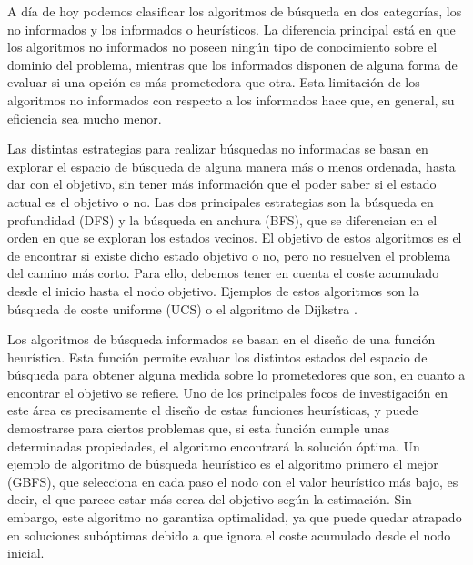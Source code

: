 \documentclass[a4paper,12pt]{article}
\begin{document}
A día de hoy podemos clasificar los algoritmos de búsqueda en dos categorías, los no informados y los informados o heurísticos. La diferencia principal está en que los algoritmos no informados no poseen ningún tipo de conocimiento sobre el dominio del problema, mientras que los informados disponen de alguna forma de evaluar si una opción es más prometedora que otra. Esta limitación de los algoritmos no informados con respecto a los informados hace que, en general, su eficiencia sea mucho menor.

Las distintas estrategias para realizar búsquedas no informadas se basan en explorar el espacio de búsqueda de alguna manera más o menos ordenada, hasta dar con el objetivo, sin tener más información que el poder saber si el estado actual es el objetivo o no. Las dos principales estrategias son la búsqueda en profundidad (DFS) y la búsqueda en anchura (BFS), que se diferencian en el orden en que se exploran los estados vecinos. El objetivo de estos algoritmos es el de encontrar si existe dicho estado objetivo o no, pero no resuelven el problema del camino más corto. Para ello, debemos tener en cuenta el coste acumulado desde el inicio hasta el nodo objetivo. Ejemplos de estos algoritmos son la búsqueda de coste uniforme (UCS) o el algoritmo de Dijkstra \cite{dijkstra_note_1959}.

Los algoritmos de búsqueda informados se basan en el diseño de una función heurística. Esta función permite evaluar los distintos estados del espacio de búsqueda para obtener alguna medida sobre lo prometedores que son, en cuanto a encontrar el objetivo se refiere. Uno de los principales focos de investigación en este área es precisamente el diseño de estas funciones heurísticas, y puede demostrarse para ciertos problemas que, si esta función cumple unas determinadas propiedades, el algoritmo encontrará la solución óptima. Un ejemplo de algoritmo de búsqueda heurístico es el algoritmo primero el mejor (GBFS), que selecciona en cada paso el nodo con el valor heurístico más bajo, es decir, el que parece estar más cerca del objetivo según la estimación. Sin embargo, este algoritmo no garantiza optimalidad, ya que puede quedar atrapado en soluciones subóptimas debido a que ignora el coste acumulado desde el nodo inicial.
\end{document}
